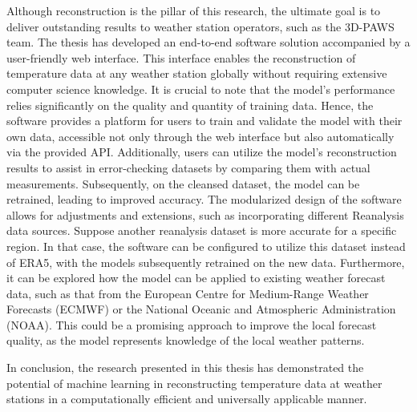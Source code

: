 Although reconstruction is the pillar of this research, the ultimate goal is to deliver outstanding results to weather station operators, such as the 3D-PAWS team.
The thesis has developed an end-to-end software solution accompanied by a user-friendly web interface.
This interface enables the reconstruction of temperature data at any weather station globally without requiring extensive computer science knowledge.
It is crucial to note that the model's performance relies significantly on the quality and quantity of training data.
Hence, the software provides a platform for users to train and validate the model with their own data, accessible not only through the web interface but also automatically via the provided API.
Additionally, users can utilize the model's reconstruction results to assist in error-checking datasets by comparing them with actual measurements.
Subsequently, on the cleansed dataset, the model can be retrained, leading to improved accuracy.
The modularized design of the software allows for adjustments and extensions, such as incorporating different Reanalysis data sources.
Suppose another reanalysis dataset is more accurate for a specific region. In that case, the software can be configured to utilize this dataset instead of ERA5, with the models subsequently retrained on the new data.
Furthermore, it can be explored how the model can be applied to existing weather forecast data, such as that from the European Centre for Medium-Range Weather Forecasts (ECMWF) or the National Oceanic and Atmospheric Administration (NOAA).
This could be a promising approach to improve the local forecast quality, as the model represents knowledge of the local weather patterns.

In conclusion, the research presented in this thesis has demonstrated the potential of machine learning in reconstructing temperature data at weather stations in a computationally efficient and universally applicable manner.